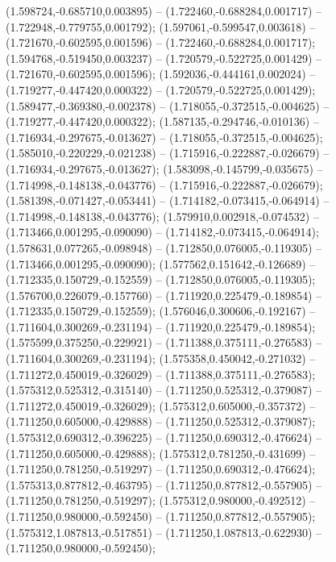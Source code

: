  (1.598724,-0.685710,0.003895) -- (1.722460,-0.688284,0.001717) -- (1.722948,-0.779755,0.001792);
 (1.597061,-0.599547,0.003618) -- (1.721670,-0.602595,0.001596) -- (1.722460,-0.688284,0.001717);
 (1.594768,-0.519450,0.003237) -- (1.720579,-0.522725,0.001429) -- (1.721670,-0.602595,0.001596);
 (1.592036,-0.444161,0.002024) -- (1.719277,-0.447420,0.000322) -- (1.720579,-0.522725,0.001429);
 (1.589477,-0.369380,-0.002378) -- (1.718055,-0.372515,-0.004625) -- (1.719277,-0.447420,0.000322);
 (1.587135,-0.294746,-0.010136) -- (1.716934,-0.297675,-0.013627) -- (1.718055,-0.372515,-0.004625);
 (1.585010,-0.220229,-0.021238) -- (1.715916,-0.222887,-0.026679) -- (1.716934,-0.297675,-0.013627);
 (1.583098,-0.145799,-0.035675) -- (1.714998,-0.148138,-0.043776) -- (1.715916,-0.222887,-0.026679);
 (1.581398,-0.071427,-0.053441) -- (1.714182,-0.073415,-0.064914) -- (1.714998,-0.148138,-0.043776);
 (1.579910,0.002918,-0.074532) -- (1.713466,0.001295,-0.090090) -- (1.714182,-0.073415,-0.064914);
 (1.578631,0.077265,-0.098948) -- (1.712850,0.076005,-0.119305) -- (1.713466,0.001295,-0.090090);
 (1.577562,0.151642,-0.126689) -- (1.712335,0.150729,-0.152559) -- (1.712850,0.076005,-0.119305);
 (1.576700,0.226079,-0.157760) -- (1.711920,0.225479,-0.189854) -- (1.712335,0.150729,-0.152559);
 (1.576046,0.300606,-0.192167) -- (1.711604,0.300269,-0.231194) -- (1.711920,0.225479,-0.189854);
 (1.575599,0.375250,-0.229921) -- (1.711388,0.375111,-0.276583) -- (1.711604,0.300269,-0.231194);
 (1.575358,0.450042,-0.271032) -- (1.711272,0.450019,-0.326029) -- (1.711388,0.375111,-0.276583);
 (1.575312,0.525312,-0.315140) -- (1.711250,0.525312,-0.379087) -- (1.711272,0.450019,-0.326029);
 (1.575312,0.605000,-0.357372) -- (1.711250,0.605000,-0.429888) -- (1.711250,0.525312,-0.379087);
 (1.575312,0.690312,-0.396225) -- (1.711250,0.690312,-0.476624) -- (1.711250,0.605000,-0.429888);
 (1.575312,0.781250,-0.431699) -- (1.711250,0.781250,-0.519297) -- (1.711250,0.690312,-0.476624);
 (1.575313,0.877812,-0.463795) -- (1.711250,0.877812,-0.557905) -- (1.711250,0.781250,-0.519297);
 (1.575312,0.980000,-0.492512) -- (1.711250,0.980000,-0.592450) -- (1.711250,0.877812,-0.557905);
 (1.575312,1.087813,-0.517851) -- (1.711250,1.087813,-0.622930) -- (1.711250,0.980000,-0.592450);

